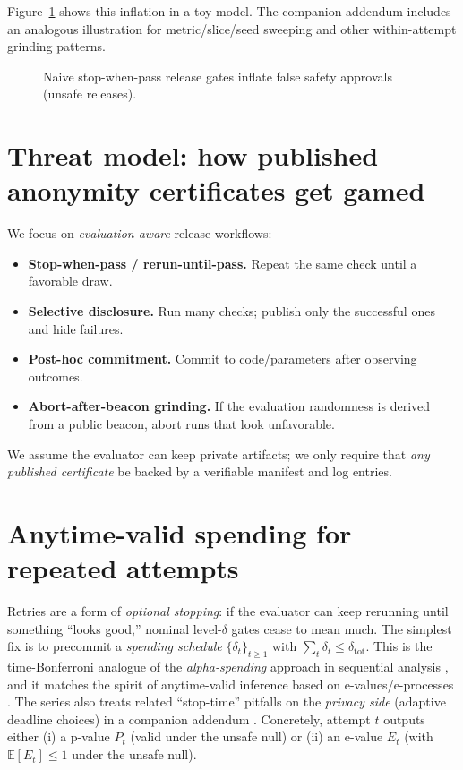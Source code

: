 \documentclass[11pt]{article}
\newcommand{\E}{\mathbb{E}}
\begin{document}
Figure~\ref{fig:stop_when_pass} shows this inflation in a toy model.
The companion addendum includes an analogous illustration for metric/slice/seed sweeping and other within-attempt grinding patterns. \cite{series:evalnotaryaddendum}


\begin{figure}[t]
\centering
{}
\caption{Naive stop-when-pass release gates inflate false safety approvals (unsafe releases).}
\label{fig:stop_when_pass}
\end{figure}




\section{Threat model: how published anonymity certificates get gamed}
We focus on \emph{evaluation-aware} release workflows:
\begin{itemize}
\item \textbf{Stop-when-pass / rerun-until-pass.} Repeat the same check until a favorable draw.
\item \textbf{Selective disclosure.} Run many checks; publish only the successful ones and hide failures.
\item \textbf{Post-hoc commitment.} Commit to code/parameters after observing outcomes.
\item \textbf{Abort-after-beacon grinding.} If the evaluation randomness is derived from a public beacon, abort runs that look unfavorable.
\end{itemize}
We assume the evaluator can keep private artifacts; we only require that \emph{any published certificate} be backed by a verifiable manifest and log entries.

\section{Anytime-valid spending for repeated attempts}
Retries are a form of \emph{optional stopping}: if the evaluator can keep rerunning until something ``looks good,'' nominal level-$\delta$ gates cease to mean much.
The simplest fix is to precommit a \emph{spending schedule} $\{\delta_t\}_{t\ge 1}$ with $\sum_t\delta_t\le\delta_{\mathrm{tot}}$.
This is the time-Bonferroni analogue of the \emph{alpha-spending} approach in sequential analysis \cite{lan_demets1983}, and it matches the spirit of anytime-valid inference based on e-values/e-processes \cite{ville1939,shafer2021betting,howard2020timeuniform,ramdas2023gts_savi}.
The series also treats related ``stop-time'' pitfalls on the \emph{privacy side} (adaptive deadline choices) in a companion addendum \cite{series:stoptimeaddendum}.
Concretely, attempt $t$ outputs either (i) a p-value $P_t$ (valid under the unsafe null) or (ii) an e-value $E_t$ (with $\E[E_t]\le 1$ under the unsafe null).
\end{document}

